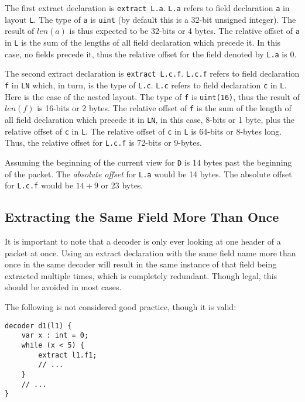 The first extract declaration is \texttt{extract L.a}. \texttt{L.a} refers to field declaration \texttt{a} in layout \texttt{L}. The type of \texttt{a} is \texttt{uint} (by default this is a 32-bit unsigned integer). The result of $len(a)$ is thus expected to be 32-bits or 4 bytes. The relative offset of \texttt{a} in \texttt{L} is the sum of the lengths of all field declaration which precede it. In this case, no fields precede it, thus the relative offset for the field denoted by \texttt{L.a} is 0.

The second extract declaration is \texttt{extract L.c.f}. \texttt{L.c.f} refers to field declaration \texttt{f} in \texttt{LN} which, in turn, is the type of \texttt{L.c}. \texttt{L.c} refers to field declaration \texttt{c} in \texttt{L}. Here is the case of the nested layout. The type of \texttt{f} is \texttt{uint(16)}, thus the result of $len(f)$ is 16-bits or 2 bytes. The relative offset of \texttt{f} is the sum of the length of all field declaration which precede it in \texttt{LN}, in this case, 8-bits or 1 byte, plus the relative offset of \texttt{c} in \texttt{L}. The relative offset of \texttt{c} in \texttt{L} is 64-bits or 8-bytes long. Thus, the relative offset for  \texttt{L.c.f} is 72-bits or 9-bytes.

Assuming the beginning of the current view for \texttt{D} is 14 bytes past the beginning of the packet. The \textit{absolute offset} for \texttt{L.a} would be 14 bytes. The absolute offset for \texttt{L.c.f} would be $14+9$ or 23 bytes.

\subsection{Extracting the Same Field More Than Once}

It is important to note that a decoder is only ever looking at one header of a packet at once. Using an extract declaration with the same field name more than once in the same decoder will result in the same instance of that field being extracted multiple times, which is completely redundant. Though legal, this should be avoided in most cases.

The following is not considered good practice, though it is valid:

\begin{minip}
\begin{lstlisting}
decoder d1(l1) {
	var x : int = 0; 	
	while (x < 5) {
		extract l1.f1;
		// ...
	}
	// ...
}
\end{lstlisting}
\end{minip}


